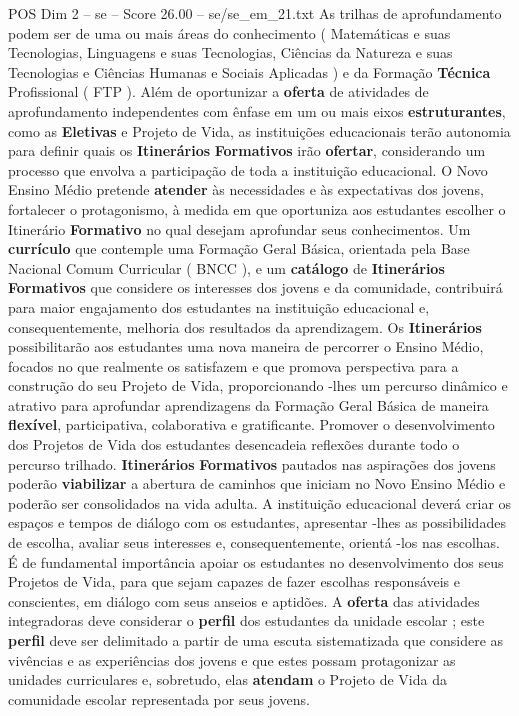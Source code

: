\begin{textsample}{POS Dim 2 – se – Score 26.00 – se/se\_em\_21.txt}
As trilhas de aprofundamento podem ser de uma ou mais áreas do conhecimento ( Matemáticas e suas Tecnologias, Linguagens e suas Tecnologias, Ciências da Natureza e suas Tecnologias e Ciências Humanas e Sociais Aplicadas ) e da Formação \textbf{Técnica} Profissional ( FTP ).
Além de oportunizar a \textbf{oferta} de atividades de aprofundamento independentes com ênfase em um ou mais eixos \textbf{estruturantes}, como as \textbf{Eletivas} e Projeto de Vida, as instituições educacionais terão autonomia para definir quais os \textbf{Itinerários} \textbf{Formativos} irão \textbf{ofertar}, considerando um processo que envolva a participação de toda a instituição educacional.
O Novo Ensino Médio pretende \textbf{atender} às necessidades e às expectativas dos jovens, fortalecer o protagonismo, à medida em que oportuniza aos estudantes escolher o Itinerário \textbf{Formativo} no qual desejam aprofundar seus conhecimentos.
Um \textbf{currículo} que contemple uma Formação Geral Básica, orientada pela Base Nacional Comum Curricular ( BNCC ), e um \textbf{catálogo} de \textbf{Itinerários} \textbf{Formativos} que considere os interesses dos jovens e da comunidade, contribuirá para maior engajamento dos estudantes na instituição educacional e, consequentemente, melhoria dos resultados da aprendizagem.
Os \textbf{Itinerários} possibilitarão aos estudantes uma nova maneira de percorrer o Ensino Médio, focados no que realmente os satisfazem e que promova perspectiva para a construção do seu Projeto de Vida, proporcionando -lhes um percurso dinâmico e atrativo para aprofundar aprendizagens da Formação Geral Básica de maneira \textbf{flexível}, participativa, colaborativa e gratificante.
Promover o desenvolvimento dos Projetos de Vida dos estudantes desencadeia reflexões durante todo o percurso trilhado. \textbf{Itinerários} \textbf{Formativos} pautados nas aspirações dos jovens poderão \textbf{viabilizar} a abertura de caminhos que iniciam no Novo Ensino Médio e poderão ser consolidados na vida adulta.
A instituição educacional deverá criar os espaços e tempos de diálogo com os estudantes, apresentar -lhes as possibilidades de escolha, avaliar seus interesses e, consequentemente, orientá -los nas escolhas.
É de fundamental importância apoiar os estudantes no desenvolvimento dos seus Projetos de Vida, para que sejam capazes de fazer escolhas responsáveis e conscientes, em diálogo com seus anseios e aptidões.
A \textbf{oferta} das atividades integradoras deve considerar o \textbf{perfil} dos estudantes da unidade escolar ; este \textbf{perfil} deve ser delimitado a partir de uma escuta sistematizada que considere as vivências e as experiências dos jovens e que estes possam protagonizar as unidades curriculares e, sobretudo, elas \textbf{atendam} o Projeto de Vida da comunidade escolar representada por seus jovens.

\end{textsample}
